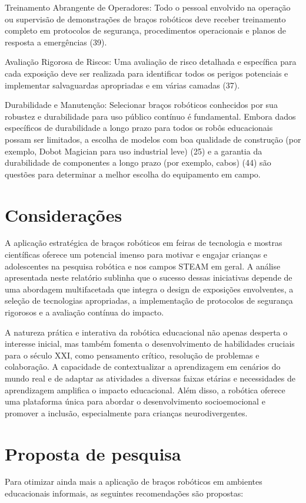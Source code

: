 \documentclass[%
  a4paper,%
  12pt,%
  fleqn,%
  english,%
  brazilian,%
]{article}
\begin{document}
\begin{description}
		\item Treinamento Abrangente de Operadores: Todo o pessoal envolvido na operação ou supervisão de demonstrações de braços robóticos deve receber treinamento completo em protocolos de segurança, procedimentos operacionais e planos de resposta a emergências (39).
		\item Avaliação Rigorosa de Riscos: Uma avaliação de risco detalhada e específica para cada exposição deve ser realizada para identificar todos os perigos potenciais e implementar salvaguardas apropriadas e em várias camadas (37).
		\item Durabilidade e Manutenção: Selecionar braços robóticos conhecidos por sua robustez e durabilidade para uso público contínuo é fundamental. Embora dados específicos de durabilidade a longo prazo para todos os robôs educacionais possam ser limitados, a escolha de modelos com boa qualidade de construção (por exemplo, Dobot Magician para uso industrial leve) (25) e a garantia da durabilidade de componentes a longo prazo (por exemplo, cabos) (44) são questões para determinar a melhor escolha do equipamento em campo.
	\end{description}
	

\section{Considerações}
A aplicação estratégica de braços robóticos em feiras de tecnologia e mostras científicas oferece um potencial imenso para motivar e engajar crianças e adolescentes na pesquisa robótica e nos campos STEAM em geral. A análise apresentada neste relatório sublinha que o sucesso dessas iniciativas depende de uma abordagem multifacetada que integra o design de exposições envolventes, a seleção de tecnologias apropriadas, a implementação de protocolos de segurança rigorosos e a avaliação contínua do impacto.

A natureza prática e interativa da robótica educacional não apenas desperta o interesse inicial, mas também fomenta o desenvolvimento de habilidades cruciais para o século XXI, como pensamento crítico, resolução de problemas e colaboração. A capacidade de contextualizar a aprendizagem em cenários do mundo real e de adaptar as atividades a diversas faixas etárias e necessidades de aprendizagem amplifica o impacto educacional. Além disso, a robótica oferece uma plataforma única para abordar o desenvolvimento socioemocional e promover a inclusão, especialmente para crianças neurodivergentes.

\section{Proposta de pesquisa}
Para otimizar ainda mais a aplicação de braços robóticos em ambientes educacionais informais, as seguintes recomendações são propostas:
\end{document}
